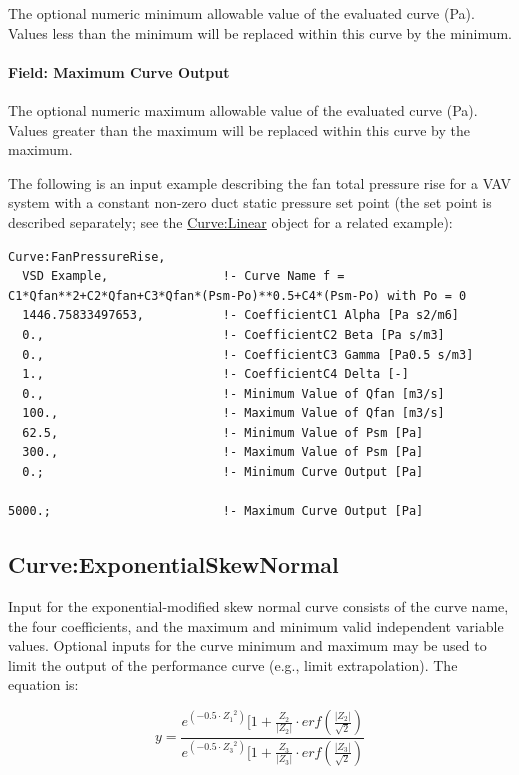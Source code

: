 The optional numeric minimum allowable value of the evaluated curve (Pa). Values less than the minimum will be replaced within this curve by the minimum.

\paragraph{Field: Maximum Curve Output}\label{field-maximum-curve-output-10}

The optional numeric maximum allowable value of the evaluated curve (Pa). Values greater than the maximum will be replaced within this curve by the maximum.

The following is an input example describing the fan total pressure rise for a VAV system with a constant non-zero duct static pressure set point (the set point is described separately; see the \hyperref[curvelinear]{Curve:Linear} object for a related example):

\begin{lstlisting}
Curve:FanPressureRise,
  VSD Example,                !- Curve Name f = C1*Qfan**2+C2*Qfan+C3*Qfan*(Psm-Po)**0.5+C4*(Psm-Po) with Po = 0
  1446.75833497653,           !- CoefficientC1 Alpha [Pa s2/m6]
  0.,                         !- CoefficientC2 Beta [Pa s/m3]
  0.,                         !- CoefficientC3 Gamma [Pa0.5 s/m3]
  1.,                         !- CoefficientC4 Delta [-]
  0.,                         !- Minimum Value of Qfan [m3/s]
  100.,                       !- Maximum Value of Qfan [m3/s]
  62.5,                       !- Minimum Value of Psm [Pa]
  300.,                       !- Maximum Value of Psm [Pa]
  0.;                         !- Minimum Curve Output [Pa]

5000.;                        !- Maximum Curve Output [Pa]
\end{lstlisting}

\subsection{Curve:ExponentialSkewNormal}\label{curveexponentialskewnormal}

Input for the exponential-modified skew normal curve consists of the curve name, the four coefficients, and the maximum and minimum valid independent variable values. Optional inputs for the curve minimum and maximum may be used to limit the output of the performance curve (e.g., limit extrapolation). The equation is:

\begin{equation}
    y = \frac{{{e^{( - 0.5 \cdot {Z_1}^2)}}[1 + \frac{{{Z_2}}}{{\left| {{Z_2}} \right|}} \cdot erf\left( {\frac{{\left| {{Z_2}} \right|}}{{\sqrt 2 }}} \right)}}{{{e^{( - 0.5 \cdot {Z_3}^2)}}[1 + \frac{{{Z_3}}}{{\left| {{Z_3}} \right|}} \cdot erf\left( {\frac{{\left| {{Z_3}} \right|}}{{\sqrt 2 }}} \right)}}
\end{equation}

